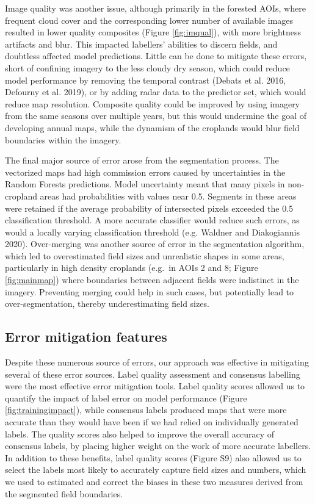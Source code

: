 \documentclass[11pt,a4paper]{article}
\begin{document}
Image quality was another issue, although primarily in the forested
AOIs, where frequent cloud cover and the corresponding lower number of
available images resulted in lower quality composites (Figure
\ref{fig:imqual}), with more brightness artifacts and blur. This
impacted labellers' abilities to discern fields, and doubtless affected
model predictions. Little can be done to mitigate these errors, short of
confining imagery to the less cloudy dry season, which could reduce
model performance by removing the temporal contrast (Debats et al. 2016,
Defourny et al. 2019), or by adding radar data to the predictor set,
which would reduce map resolution. Composite quality could be improved
by using imagery from the same seasons over multiple years, but this
would undermine the goal of developing annual maps, while the dynamism
of the croplands would blur field boundaries within the imagery.

The final major source of error arose from the segmentation process. The
vectorized maps had high commission errors caused by uncertainties in
the Random Forests predictions. Model uncertainty meant that many pixels
in non-cropland areas had probabilities with values near 0.5. Segments
in these areas were retained if the average probability of intersected
pixels exceeded the 0.5 classification threshold. A more accurate
classifier would reduce such errors, as would a locally varying
classification threshold (e.g. Waldner and Diakogiannis 2020).
Over-merging was another source of error in the segmentation algorithm,
which led to overestimated field sizes and unrealistic shapes in some
areas, particularly in high density croplands (e.g.~in AOIs 2 and 8;
Figure \ref{fig:mainmap}) where boundaries between adjacent fields were
indistinct in the imagery. Preventing merging could help in such cases,
but potentially lead to over-segmentation, thereby underestimating field
sizes.

\hypertarget{error-mitigation-features}{%
\subsection{Error mitigation features}\label{error-mitigation-features}}

Despite these numerous source of errors, our approach was effective in
mitigating several of these error sources. Label quality assessment and
consensus labelling were the most effective error mitigation tools.
Label quality scores allowed us to quantify the impact of label error on
model performance (Figure \ref{fig:trainingimpact}), while consensus
labels produced maps that were more accurate than they would have been
if we had relied on individually generated labels. The quality scores
also helped to improve the overall accuracy of consensus labels, by
placing higher weight on the work of more accurate labellers. In
addition to these benefits, label quality scores (Figure S9) also
allowed us to select the labels most likely to accurately capture field
sizes and numbers, which we used to estimated and correct the biases in
these two measures derived from the segmented field boundaries.
\end{document}
